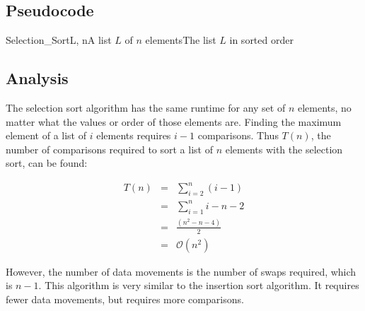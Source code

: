\documentclass[12pt]{article}
\begin{document}
\subsection*{Pseudocode}

\begin{Lalgorithm}{Selection\_Sort}{L, n}{A list $L$ of $n$ elements}{The list $L$ in sorted order}
\end{Lalgorithm}

\subsection*{Analysis}

The selection sort algorithm has the same runtime for any set of $n$ elements, no matter
what the values or order of those elements are.  Finding the maximum element of a list of
$i$ elements requires $i - 1$ comparisons.  Thus $T(n)$, the number of comparisons required to
sort a list of $n$ elements with the selection sort, can be found:

\begin{eqnarray*}
    T(n) & = & \sum_{i=2}^n(i-1) \\
         & = & \sum_{i=1}^ni-n-2 \\
         & = & \frac{(n^2-n-4)}{2} \\
         & = & \mathcal{O}(n^2)
\end{eqnarray*}

However, the number of data movements is the number of swaps required, which is $n-1$.  This
algorithm is very similar to the insertion sort algorithm.  It requires fewer data movements,
but requires more comparisons.
\end{document}
